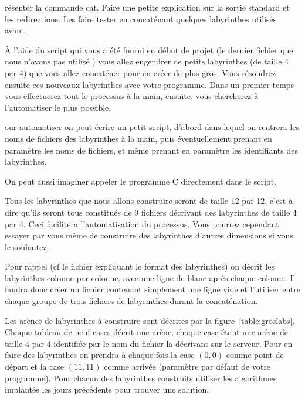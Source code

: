 \documentclass[a4paper]{article}
\newenvironment{enseignants}[1]{\noindent\color{blue}{\bf #1}}{}
\begin{document}
\begin{enseignants}
  Présenter la commande cat.
  Faire une petite explication sur la sortie standard et les redirections.
  Les faire tester en concaténant quelques labyrinthes utilisés avant.
\end{enseignants}

À l'aide du script qui vous a été fourni en début de projet (le dernier fichier que nous n'avons pas utilisé ) vous allez engendrer de petits labyrinthes (de taille 4 par 4) que vous allez concaténer pour en créer de plus gros. Vous résoudrez ensuite ces nouveaux labyrinthes avec votre programme.
Dans un premier temps vous effectuerez tout le processus à la main,
ensuite, vous chercherez à l'automatiser le plus possible.

\begin{enseignants}
  Pour automatiser on peut écrire un petit script, d'abord dans lequel on rentrera les noms de fichiers des labyrinthes à la main, puis éventuellement prenant en paramètre les noms de fichiers, et même prenant en paramètre les identifiants des labyrinthes.

  On peut aussi imaginer appeler le programme C directement dans le script.
\end{enseignants}

Tous les labyrinthes que nous allons construire seront de taille 12 par 12, c'est-à-dire qu'ils seront tous constitués de 9 fichiers décrivant des labyrinthes de taille 4 par 4. Ceci facilitera l'automatisation du processus. Vous pourrez cependant essayer par vous même de construire des labyrinthes d'autres dimensions si vous le souhaitez.

\begin{enseignants}{Attention}
Pour rappel (cf le fichier expliquant le format des labyrinthes) on décrit les labyrinthes colonne par colonne, avec une ligne de blanc après chaque colonne. Il faudra donc créer un fichier contenant simplement une ligne vide et l'utiliser entre chaque groupe de trois fichiers de labyrinthes durant la concaténation.
\end{enseignants}

Les arènes de labyrinthes à construire sont décrites par la figure~\ref{table:groslabs}.
Chaque tableau de neuf cases décrit une arène, chaque case étant une arène de taille 4 par 4 identifiée par le nom du fichier la décrivant sur le serveur.
Pour en faire des labyrinthes on prendra à chaque fois la case $(0,0)$ comme point de départ et la case $(11,11)$ comme arrivée (paramètre par défaut de votre programme).
Pour chacun des labyrinthes construits utiliser les algorithmes implantés les jours précédents pour trouver une solution.
\end{document}
